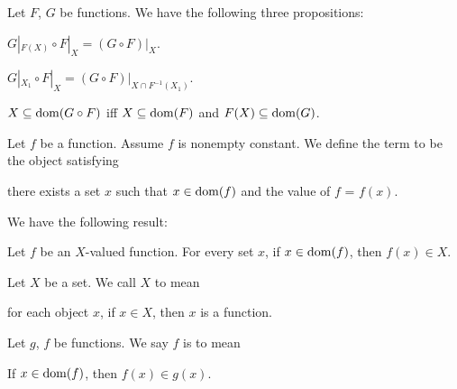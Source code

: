 \documentclass{article}
\begin{document}
Let $F$, $G$ be functions. We have the following three propositions:
\begin{thm}
\item\label{funct1:99} $G|_{F(X)}\circ F|_{X}=(G\circ F)|_{X}$.
\item\label{funct1:100} $G|_{X_{1}}\circ F|_{X}=(G\circ F)|_{X\cap F^{-1}(X_{1})}$.
\item\label{funct1:101} $X\subseteq\operatorname{dom}(G\circ F)$ iff $X\subseteq\operatorname{dom}(F)$
  and $F(X)\subseteq\operatorname{dom}(G)$.
\end{thm}

\begin{definition}
Let $f$ be a function. Assume $f$ is nonempty constant.
We define the term  to be the object satisfying
\begin{defn}
\item there exists a set $x$ such that $x\in\operatorname{dom}(f)$ and the value of
  $f$ = $f(x)$.
\end{defn}
\end{definition}

We have the following result:
\begin{thm}
\item\label{funct1:102} Let $f$ be an $X$-valued function.
  For every set $x$, if $x\in\operatorname{dom}(f)$, then $f(x)\in X$.
\end{thm}

\begin{definition}
Let $X$ be a set. We call $X$  to mean
\begin{defn}
\item for each object $x$, if $x\in X$, then $x$ is a function.
\end{defn}
\end{definition}

\begin{definition}
Let $g$, $f$ be functions. We say $f$ is  to mean
\begin{defn}
\item If $x\in\operatorname{dom}(f)$, then $f(x)\in g(x)$.
\end{defn}
\end{definition}
\end{document}

